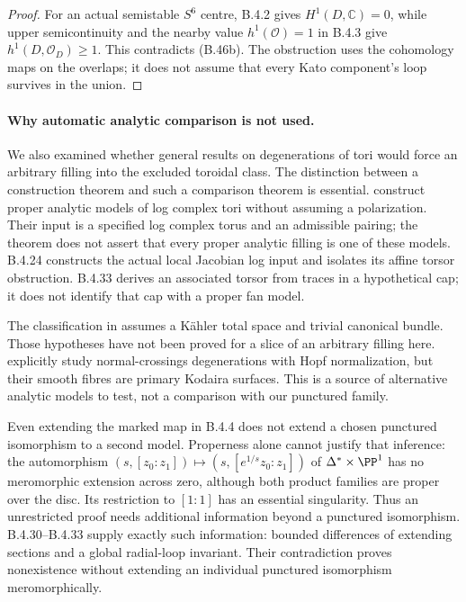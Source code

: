 \begin{proof}
For an actual semistable $S^6$ centre, B.4.2 gives
$H^1(D,\mathbb C)=0$, while upper semicontinuity
and the nearby value $h^1(\mathcal O)=1$ in B.4.3
give $h^1(D,\mathcal O_D)\geq1$. This contradicts
(B.46b). The obstruction uses the cohomology maps
on the overlaps; it does not assume that every
Kato component's loop survives in the union.
\end{proof}


\paragraph{Why automatic analytic comparison is not used.}
We also examined whether general results on degenerations of tori
would force an arbitrary filling into the excluded toroidal class.
The distinction between a construction theorem and such a comparison
theorem is essential. \citet[Theorem 5.1.3 and Sections 5.2--5.4]
{KKN2008Root} construct proper analytic models of log complex tori
without assuming a polarization. Their input is a specified log
complex torus and an admissible pairing; the theorem does not assert
that every proper analytic filling is one of these models.
B.4.24 constructs the actual local Jacobian log input and isolates
its affine torsor obstruction. B.4.33 derives an associated torsor
from traces in a hypothetical cap; it does not identify that cap
with a proper fan model.

The classification in \citet[Theorem 3.1]{KamenovaToriRoot} assumes
a K\"ahler total space and trivial canonical bundle. Those hypotheses
have not been proved for a slice of an arbitrary filling here.
\citet[Section 3, Proposition 3.1]{SchroeerSiebert2002Root} explicitly
study normal-crossings degenerations with Hopf normalization, but
their smooth fibres are primary Kodaira surfaces. This is a source
of alternative analytic models to test, not a comparison with our
punctured family.

Even extending the marked map in B.4.4 does not extend a chosen
punctured isomorphism to a second model. Properness alone cannot
justify that inference: the automorphism
$(s,[z_0:z_1])\mapsto(s,[e^{1/s}z_0:z_1])$ of
$\Delta^*\times\PP^1$ has no meromorphic extension across zero,
although both product families are proper over the disc. Its
restriction to $[1:1]$ has an essential singularity. Thus an
unrestricted proof needs additional information beyond a
punctured isomorphism. B.4.30--B.4.33 supply exactly such information:
bounded differences of extending sections and a global radial-loop
invariant. Their contradiction proves nonexistence without extending
an individual punctured isomorphism meromorphically.



